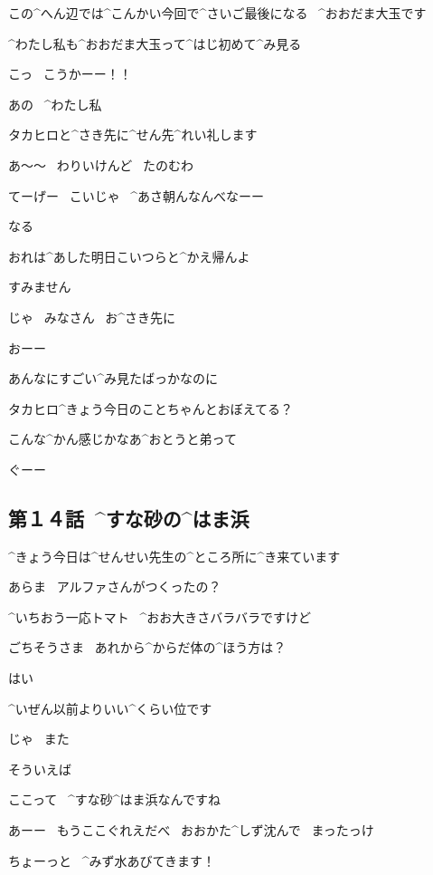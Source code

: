 \Alpha この^{へん}{辺}では^{こんかい}{今回}で^{さいご}{最後}になる
\ ^{おおだま}{大玉}です

\page[89]
\Alpha ^{わたし}{私}も^{おおだま}{大玉}って^{はじ}{初}めて^{み}{見}る

\page[92]
\Alpha こっ
\ こうかーー！！

\page[96]
\Alpha あの
\ ^{わたし}{私}

\Alpha タカヒロと^{さき}{先}に^{せん}{先}^{れい}{礼}します

\page[97]
\Ojisan あ〜〜
\ わりいけんど
\ たのむわ

\Ojisan てーげー
\ こいじゃ
\ ^{あさ}{朝}んなんべなーー

\Ojisan なる

\Ojisan おれは^{あした}{明日}こいつらと^{かえ}{帰}んよ

\Alpha すみません

\Alpha じゃ
\ みなさん
\ お^{さき}{先}に

\Person おーー

\page[98]
\Alpha あんなにすごい^{み}{見}たばっかなのに

\page[99]
\Alpha タカヒロ^{きょう}{今日}のことちゃんとおぼえてる？

\page[100]
\Alpha こんな^{かん}{感}じかなあ^{おとうと}{弟}って

\Alpha ぐーー


\subsection{第１４話\ ^{すな}{砂}の^{はま}{浜}}

\page[102]
\Alpha ^{きょう}{今日}は^{せんせい}{先生}の^{ところ}{所}に^{き}{来}ています

\Sensei あらま
\ アルファさんがつくったの？

\Alpha ^{いちおう}{一応}トマト
\ ^{おお}{大}きさバラバラですけど

\Sensei ごちそうさま
\ あれから^{からだ}{体}の^{ほう}{方}は？

\Alpha はい

\Alpha ^{いぜん}{以前}よりいい^{くらい}{位}です

\Alpha じゃ
\ また

\page[103]
\Alpha そういえば

\Alpha ここって
\ ^{すな}{砂}^{はま}{浜}なんですね

\Ojisan あーー
\ もうここぐれえだべ
\ おおかた^{しず}{沈}んで
\ まったっけ

\Alpha ちょーっと
\ ^{みず}{水}あびてきます！

